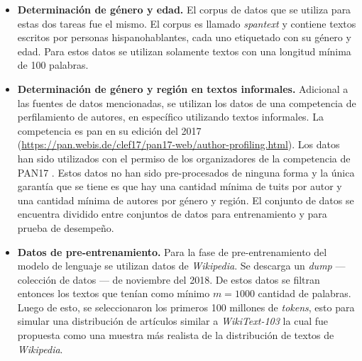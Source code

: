\begin{itemize}

\item \textbf{Determinación de género y edad.} El corpus de datos que se utiliza para estas dos tareas fue el mismo. El corpus es llamado \textit{\gls{spantext}} \parencite{villegas:2014:CACIC} y contiene textos escritos por personas hispanohablantes, cada uno etiquetado con su género y edad. Para estos datos se utilizan solamente textos con una longitud mínima de 100 palabras.

\item \textbf{Determinación de género y región en textos informales.} Adicional a las fuentes de datos mencionadas, se utilizan los datos de una competencia de perfilamiento de autores, en específico utilizando textos informales. La competencia es \gls{pan} en su edición del 2017 (\url{https://pan.webis.de/clef17/pan17-web/author-profiling.html}). Los datos han sido utilizados con el permiso de los organizadores de la competencia de PAN17 \parencite{rangel2017proceedings}. Estos datos no han sido pre-procesados de ninguna forma y la única garantía que se tiene es que hay una cantidad mínima de tuits por autor y una cantidad mínima de autores por género y región. El conjunto de datos se encuentra dividido entre conjuntos de datos para entrenamiento y para prueba de desempeño.

\item \textbf{Datos de pre-entrenamiento.} Para la fase de pre-entrenamiento del modelo de lenguaje se utilizan datos de \textit{Wikipedia}. Se descarga un \textit{dump} --- colección de datos --- de noviembre del 2018. De estos datos se filtran entonces los textos que tenían como mínimo $m = 1000$ cantidad de palabras. Luego de esto, se seleccionaron los primeros 100 millones de \textit{tokens}, esto para simular una distribución de artículos similar a \textit{WikiText-103} \parencite{merity2016pointer} la cual fue propuesta como una muestra más realista de la distribución de textos de \textit{Wikipedia}.
\end{itemize}
